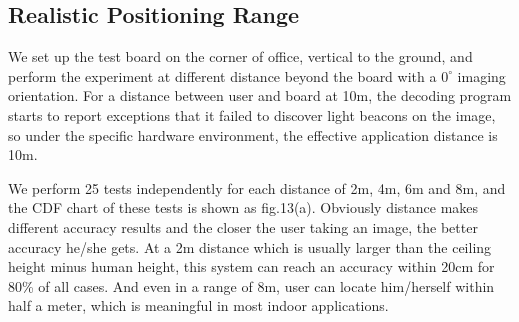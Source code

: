 \documentclass[conference]{IEEEtran}
\begin{document}
\subsection{\textbf{Realistic Positioning Range}}
We set up the test board on the corner of office, vertical to the ground, and perform the experiment at different distance beyond the board with a $0^{\circ}$ imaging orientation. For a distance between user and board at 10m, the decoding program starts to report exceptions that it failed to discover light beacons on the image, so under the specific hardware environment, the effective application distance is 10m.

We perform 25 tests independently for each distance of 2m, 4m, 6m and 8m, and the CDF chart of these tests is shown as fig.13(a). Obviously distance makes different accuracy results and the closer the user taking an image, the better accuracy he/she gets. At a 2m distance which is usually larger than the ceiling height minus human height, this system can reach an accuracy within 20cm for 80\% of all cases. And even in a range of 8m, user can locate him/herself within half a meter, which is meaningful in most indoor applications. 

\begin{figure}
	\footnotesize
\end{figure}
\end{document}
